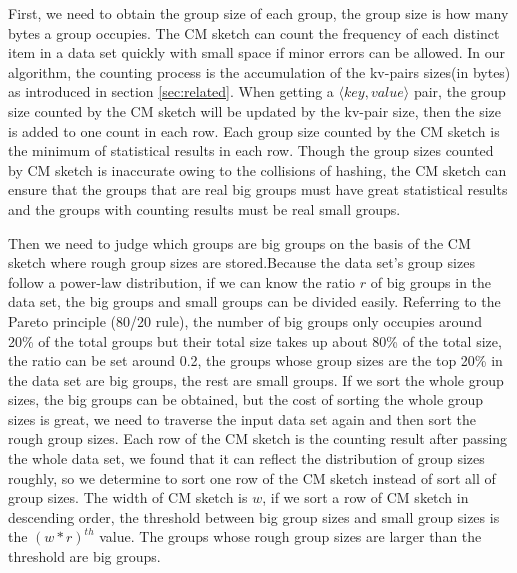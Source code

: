 First, we need to obtain the group size of each group, the group size is how many bytes a group occupies. The CM sketch can count the frequency of each distinct item in a data set quickly with small space if minor errors can be allowed. In our algorithm, the counting process is the accumulation of the kv-pairs sizes(in bytes) as introduced in section \ref{sec:related}. When getting a $\langle key, value\rangle$ pair, the group size counted by the CM sketch will be updated by the kv-pair size, then the size is added to one count in each row. Each group size counted by the CM sketch is the minimum of statistical results in each row. Though the group sizes counted by CM sketch is inaccurate owing to the collisions of hashing, the CM sketch can ensure that the groups that are real big groups must have great statistical results and the groups with counting results must be real small groups.

Then we need to judge which groups are big groups on the basis of the CM sketch where rough group sizes are stored.Because the data set's group sizes follow a power-law distribution, if we can know the ratio $r$ of big groups in the data set, the big groups and small groups can be divided easily. Referring to the Pareto principle (80/20 rule), the number of big groups only occupies around 20\% of the total groups but their total size takes up about 80\% of the total size, the ratio can be set around 0.2, the groups whose group sizes are the top 20\% in the data set are big groups, the rest are small groups. If we sort the whole group sizes, the big groups can be obtained, but the cost of sorting the whole group sizes is great, we need to traverse the input data set again and then sort the rough group sizes. Each row of the CM sketch is the counting result after passing the whole data set, we found that it can reflect the distribution of group sizes roughly, so we determine to sort one row of the CM sketch instead of sort all of group sizes. The width of CM sketch is $w$, if we sort a row of CM sketch in descending order, the threshold between big group sizes and small group sizes is the ${(w*r)}^{th}$ value. The groups whose rough group sizes are larger than the threshold are big groups.

